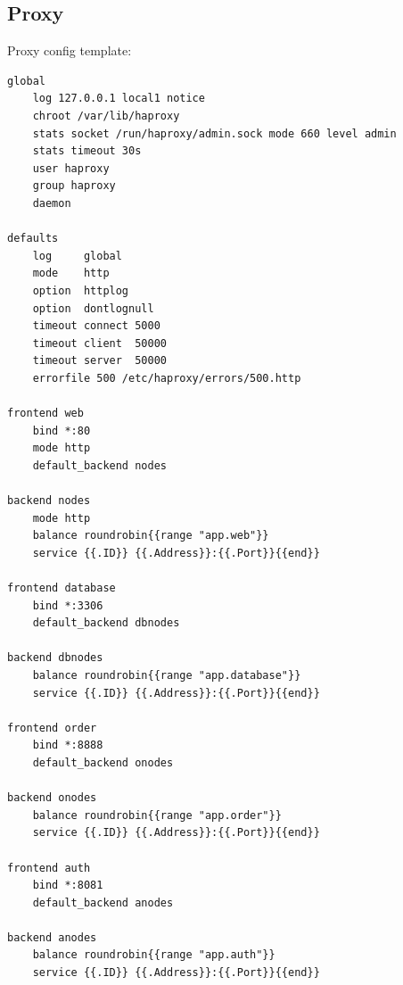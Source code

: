 \documentclass[11pt,magyar,a4paper,twoside,]{report}
\begin{document}
\subsection{\texorpdfstring{Proxy\label{appendix-template}}{Proxy}}\label{proxy-1}

Proxy config template:

\begin{verbatim}
global
    log 127.0.0.1 local1 notice
    chroot /var/lib/haproxy
    stats socket /run/haproxy/admin.sock mode 660 level admin
    stats timeout 30s
    user haproxy
    group haproxy
    daemon

defaults
    log     global
    mode    http
    option  httplog
    option  dontlognull
    timeout connect 5000
    timeout client  50000
    timeout server  50000
    errorfile 500 /etc/haproxy/errors/500.http

frontend web
    bind *:80
    mode http
    default_backend nodes

backend nodes
    mode http
    balance roundrobin{{range "app.web"}}
    service {{.ID}} {{.Address}}:{{.Port}}{{end}}

frontend database
    bind *:3306
    default_backend dbnodes

backend dbnodes
    balance roundrobin{{range "app.database"}}
    service {{.ID}} {{.Address}}:{{.Port}}{{end}}

frontend order
    bind *:8888
    default_backend onodes

backend onodes
    balance roundrobin{{range "app.order"}}
    service {{.ID}} {{.Address}}:{{.Port}}{{end}}

frontend auth
    bind *:8081
    default_backend anodes

backend anodes
    balance roundrobin{{range "app.auth"}}
    service {{.ID}} {{.Address}}:{{.Port}}{{end}}
\end{verbatim}
\end{document}
